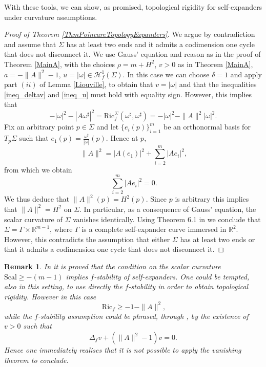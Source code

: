 \documentclass[11pt, leqno]{amsart}
\newtheorem{remark}[theorem]{Remark}
\begin{document}
With these tools, we can show, as promised, topological rigidity for self-expanders under curvature assumptions.

\begin{proof}[Proof of Theorem \ref{ThmPoincareTopologyExpanders}]
 We argue by contradiction and assume that $\Sigma$ has at least two ends and it admits a codimension one cycle that does not disconnect it. We use Gauss' equation and reason as in the proof of Theorem \ref{MainA}, with the choices $\rho=m+H^2$, $v>0$ as in Theorem \ref{MainA}, $a=-\|A\|^2-1$, $u=|\omega|\in\mathcal{H}^1_f(\Sigma)$. In this case we can choose $\delta=1$ and apply part $(ii)$ of Lemma \ref{Liouville}, to obtain that $v=|\omega|$ and that the inequalities \eqref{ineq_deltav} and \eqref{ineq_u} must hold with equality sign. However, this implies that
\[
-|\omega|^2-|A\omega^\sharp|^2=\mathrm{Ric}^\Sigma_f(\omega^\sharp,\omega^\sharp)=-|\omega|^2-\|A\|^2|\omega|^2.
\]
Fix an arbitrary point $p\in \Sigma$ and let $\{e_{i}(p)\}_{i=1}^{m}$ be an orthonormal basis for $T_{p}\Sigma$ such that $e_{1}(p)=\frac{\omega^\sharp}{|\omega|}(p)$. Hence at $p$, 
\[
\ \|A\|^2=|A(e_1)|^2+\sum_{i=2}^{m}|Ae_{i}|^2,
\]
from which we obtain
\[
\ \sum_{i=2}^{m}|Ae_{i}|^2=0.
\]
We thus deduce that $\|A\|^2(p)=H^2(p)$. Since $p$ is arbitrary this implies that $\|A\|^2=H^2$ on $\Sigma$. In particular, as a consequence of Gauss' equation, the scalar curvature of $\Sigma$ vanishes identically. Using Theorem 6.1 in \cite{AncariCheng_GeoDed} we conclude that $\Sigma=\Gamma\times\mathbb{R}^{m-1}$, where $\Gamma$ is a complete self-expander curve immersed in $\mathbb{R}^2$. However, this contradicts the assumption that either $\Sigma$ has at least two ends or that it admits a codimension one cycle that does not disconnect it.   
\end{proof}

\begin{remark}
\rm{In \cite[Corollary 1.1]{AncariCheng_GeoDed} it is proved that the condition on the scalar curvature $\mathrm{Scal}\geq -(m-1)$ implies $f$-stability of self-expanders. One could be tempted, also in this setting, to use directly the $f$-stability in order to obtain topological rigidity. However in this case
\[
\ \mathrm{Ric}_{f}\geq -1-\|A\|^2,
\]
while the $f$-stability assumption could be phrased, through \cite{FCS}, by the existence of $v>0$ such that
\[
\Delta_{f}v+(\|A\|^2-1)v=0.
\]
Hence one immediately realises that it is not possible to apply the vanishing theorem to conclude.}
\end{remark}
\end{document}
